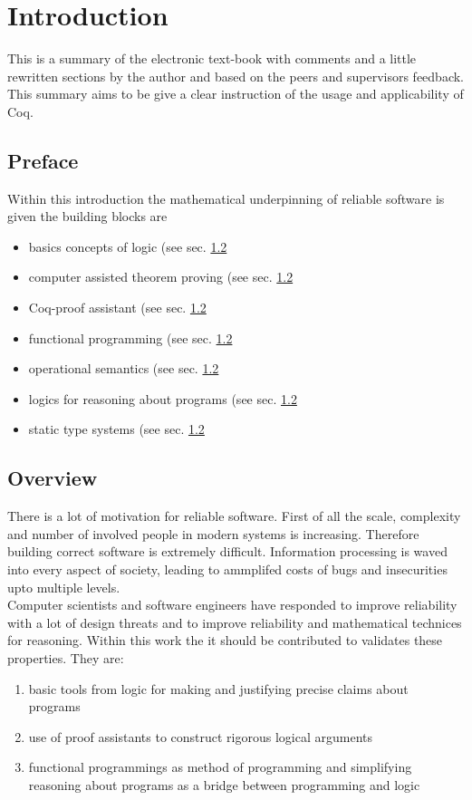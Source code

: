 \section{Introduction}

This is a summary of the electronic text-book \cite{PACGGHSY} with comments and a little rewritten sections by the author and based on the peers and supervisors feedback.
This summary aims to be give a clear instruction of the usage and applicability of Coq.\\

\subsection{Preface}
Within this introduction the mathematical underpinning of reliable software is given the building blocks are
\begin{itemize}
\item basics concepts of logic (see sec. \ref{} %
\item computer assisted theorem proving (see sec. \ref{} %
\item Coq-proof assistant (see sec. \ref{} %
\item functional programming (see sec. \ref{} %
\item operational semantics (see sec. \ref{} %
\item logics for reasoning about programs (see sec. \ref{} %
\item static type systems (see sec. \ref{} %
\end{itemize} 

\subsection{Overview}
There is a lot of motivation for reliable software. 
First of all the scale, complexity and number of involved people in modern systems is increasing.
Therefore building correct software is extremely difficult.
Information processing is waved into every aspect of society, leading to ammplifed costs of bugs and insecurities upto multiple levels.\\
Computer scientists and software engineers have responded to improve reliability with a lot of design threats and to improve reliability and mathematical technices for reasoning.
Within this work the it should be contributed to validates these properties. They are:
\begin{enumerate}
\item basic tools from logic for making and justifying precise claims about programs
\item use of proof assistants to construct rigorous logical arguments
\item functional programmings as method of programming and simplifying reasoning about programs as a bridge between programming and logic
\end{enumerate}



